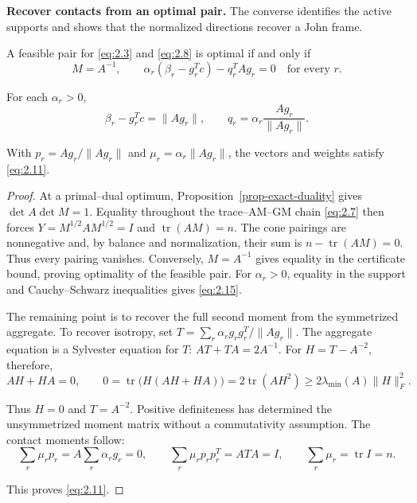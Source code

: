 \textbf{Recover contacts from an optimal pair.} The converse identifies the active
supports and shows that the normalized directions recover a John frame.

\begin{proposition}\label{prop-kkt}
A feasible pair for \eqref{eq:2.3} and \eqref{eq:2.8} is optimal if and only if
\begin{equation}\label{eq:2.14}
M=A^{-1},\qquad
\alpha_r(\beta_r-g_r^Tc)-q_r^TAg_r=0\quad\text{for every }r.
\end{equation}

For each $\alpha_r>0$,
\begin{equation}\label{eq:2.15}
\beta_r-g_r^Tc=\|Ag_r\|,\qquad
q_r=\alpha_r\frac{Ag_r}{\|Ag_r\|}.
\end{equation}

With $p_r=Ag_r/\|Ag_r\|$ and $\mu_r=\alpha_r\|Ag_r\|$, the vectors and weights satisfy \eqref{eq:2.11}.

\end{proposition}

\begin{proof}
At a primal--dual optimum, Proposition~\ref{prop-exact-duality} gives
$\det A\det M=1$. Equality throughout the trace--AM--GM chain \eqref{eq:2.7} then forces
$Y=M^{1/2}AM^{1/2}=I$ and $\operatorname{tr}(AM)=n$.
The cone pairings are nonnegative and, by balance and normalization, their
sum is $n-\operatorname{tr}(AM)=0$. Thus every pairing vanishes.
Conversely, $M=A^{-1}$ gives equality in the certificate bound, proving
optimality of the feasible pair. For $\alpha_r>0$, equality in the support
and Cauchy--Schwarz inequalities gives \eqref{eq:2.15}.

The remaining point is to recover the full second moment from the symmetrized
aggregate. To recover isotropy, set $T=\sum_r\alpha_rg_rg_r^T/\|Ag_r\|$.
The aggregate equation is a Sylvester equation for $T$:
$AT+TA=2A^{-1}$. For $H=T-A^{-2}$, therefore,
\begin{equation}\label{eq:2.16}
AH+HA=0,
\qquad
0=\operatorname{tr}\bigl(H(AH+HA)\bigr)
=2\operatorname{tr}(AH^2)
\ge2\lambda_{\min}(A)\|H\|_F^2.
\end{equation}

Thus $H=0$ and $T=A^{-2}$. Positive definiteness has determined the
unsymmetrized moment matrix without a commutativity assumption.
The contact moments follow:
\begin{equation}\label{eq:2.17}
\sum_r\mu_rp_r=A\sum_r\alpha_rg_r=0,
\qquad
\sum_r\mu_rp_rp_r^T=ATA=I,
\qquad
\sum_r\mu_r=\operatorname{tr}I=n.
\end{equation}

This proves \eqref{eq:2.11}. 
\end{proof}

